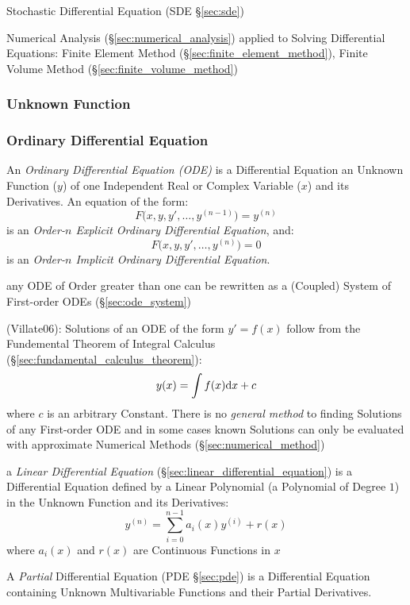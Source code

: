 \fist Stochastic Differential Equation (SDE \S\ref{sec:sde})

\fist Numerical Analysis (\S\ref{sec:numerical_analysis}) applied to Solving
Differential Equations: Finite Element Method
(\S\ref{sec:finite_element_method}), Finite Volume Method
(\S\ref{sec:finite_volume_method})



\subsubsection{Unknown Function}\label{sec:unknown_function}

\subsubsection{Ordinary Differential Equation}\label{sec:ode}

An \emph{Ordinary Differential Equation (ODE)} is a Differential Equation an
Unknown Function ($y$) of one Independent Real or Complex Variable ($x$) and its
Derivatives. An equation of the form:
\[
  F\Big(x,y,y',\ldots,y^{(n-1)}\Big) = y^{(n)}
\]
is an \emph{Order-$n$ Explicit Ordinary Differential Equation}, and:
\[
  F\Big(x,y,y',\ldots,y^{(n)}\Big) = 0
\]
is an \emph{Order-$n$ Implicit Ordinary Differential Equation}.

any ODE of Order greater than one can be rewritten as a (Coupled) System of
First-order ODEs (\S\ref{sec:ode_system})

(Villate06): Solutions of an ODE of the form $y' = f(x)$ follow from the
Fundemental Theorem of Integral Calculus
(\S\ref{sec:fundamental_calculus_theorem}):
\[
y(x) = \int f(x) \mathrm{d}x + c
\]
where $c$ is an arbitrary Constant. There is no \emph{general method} to finding
Solutions of any First-order ODE and in some cases known Solutions can only be
evaluated with approximate Numerical Methods (\S\ref{sec:numerical_method})

\fist a \emph{Linear Differential Equation}
(\S\ref{sec:linear_differential_equation}) is a Differential Equation defined
by a Linear Polynomial (a Polynomial of Degree $1$) in the Unknown Function and
its Derivatives:
\[
  y^{(n)} = \sum_{i=0}^{n-1} a_i (x) y^{(i)} + r(x)
\]
where $a_i(x)$ and $r(x)$ are Continuous Functions in $x$

\fist A \emph{Partial} Differential Equation (PDE
\S\ref{sec:pde}) is a Differential Equation
containing Unknown Multivariable Functions and their Partial Derivatives.

